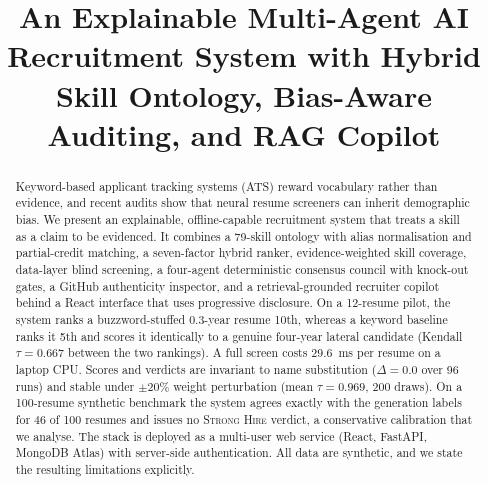 \documentclass[conference]{IEEEtran}
\newcommand{\verd}[1]{\textsc{#1}}
\newcommand{\Sstrong}{\verd{Strong Hire}}
\begin{document}
\title{An Explainable Multi-Agent AI Recruitment System with Hybrid Skill Ontology, Bias-Aware Auditing, and RAG Copilot}

\author{
\and
{}
\and
{}
}

\maketitle

\begin{abstract}
Keyword-based applicant tracking systems (ATS) reward vocabulary rather than evidence, and recent audits show that neural resume screeners can inherit demographic bias. We present an explainable, offline-capable recruitment system that treats a skill as a claim to be evidenced. It combines a 79-skill ontology with alias normalisation and partial-credit matching, a seven-factor hybrid ranker, evidence-weighted skill coverage, data-layer blind screening, a four-agent deterministic consensus council with knock-out gates, a GitHub authenticity inspector, and a retrieval-grounded recruiter copilot behind a React interface that uses progressive disclosure. On a 12-resume pilot, the system ranks a buzzword-stuffed 0.3-year resume 10th, whereas a keyword baseline ranks it 5th and scores it identically to a genuine four-year lateral candidate (Kendall $\tau=0.667$ between the two rankings). A full screen costs 29.6~ms per resume on a laptop CPU. Scores and verdicts are invariant to name substitution ($\Delta=0.0$ over 96 runs) and stable under $\pm20\%$ weight perturbation (mean $\tau=0.969$, 200 draws). On a 100-resume synthetic benchmark the system agrees exactly with the generation labels for 46 of 100 resumes and issues no \Sstrong{} verdict, a conservative calibration that we analyse. The stack is deployed as a multi-user web service (React, FastAPI, MongoDB Atlas) with server-side authentication. All data are synthetic, and we state the resulting limitations explicitly.
\end{abstract}
\end{document}
